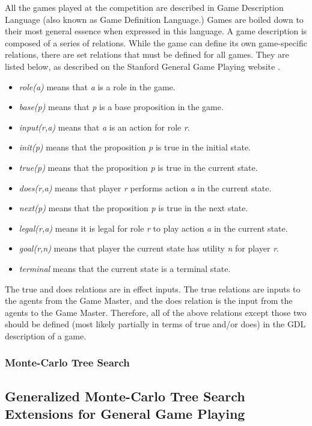 \documentclass[letterpaper]{article}
\begin{document}
All the games played at the competition are described in Game Description Language (also known as Game Definition Language.) Games are boiled down to their most general essence when expressed in this language. A game description is composed of a series of relations. While the game can define its own game-specific relations, there are set relations that must be defined for all games. They are listed below, as described on the Stanford General Game Playing website \cite{StanfordGGP}.
\begin{itemize}
\item \emph{role(a)} means that \emph{a} is a role in the game.
\item \emph{base(p)} means that \emph{p} is a base proposition in the game.
\item \emph{input(r,a)} means that \emph{a} is an action for role \emph{r}.
\item \emph{init(p)} means that the proposition \emph{p} is true in the initial state.
\item \emph{true(p)} means that the proposition \emph{p} is true in the current state.
\item \emph{does(r,a)} means that player \emph{r} performs action \emph{a} in the current state.
\item \emph{next(p)} means that the proposition \emph{p} is true in the next state.
\item \emph{legal(r,a)} means it is legal for role \emph{r} to play action \emph{a} in the current state.
\item \emph{goal(r,n)} means that player the current state has utility \emph{n} for player \emph{r}.
\item \emph{terminal} means that the current state is a terminal state.
\end{itemize}

The true and does relations are in effect inputs. The true relations are inputs to the agents from the Game Master, and the does relation is the input from the agents to the Game Master. Therefore, all of the above relations except those two should be defined (most likely partially in terms of true and/or does) in the GDL description of a game.

\subsubsection{Monte-Carlo Tree Search}

\subsection{Generalized Monte-Carlo Tree Search Extensions for General Game Playing}
\end{document}
